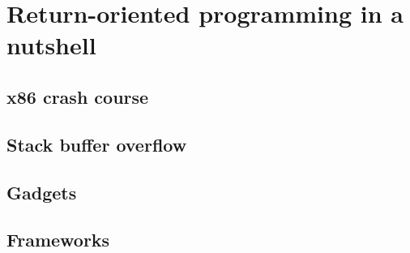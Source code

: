 \section{Return-oriented programming in a nutshell}
\subsection{x86 crash course}



\subsection{Stack buffer overflow}



\subsection{Gadgets}



\subsection{Frameworks}
